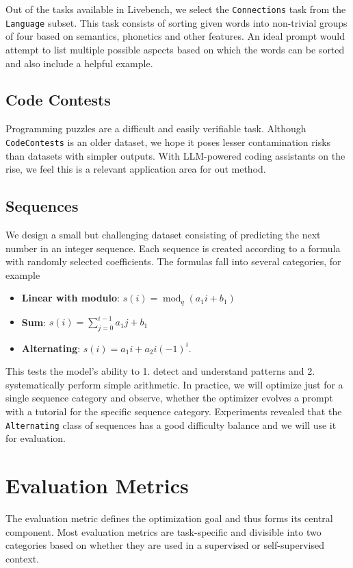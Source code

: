 Out of the tasks available in Livebench, we select the \texttt{Connections} task from the \texttt{Language} subset. 
This task consists of sorting given words into non-trivial groups of four based on semantics, phonetics and other features. 
An ideal prompt would attempt to list multiple possible aspects based on which the words can be sorted and also include a helpful example.

\subsection{Code Contests}
Programming puzzles are a difficult and easily verifiable task. Although \texttt{CodeContests}\cite{li2022competition} is an older dataset, 
we hope it poses lesser contamination risks than datasets with simpler outputs. With LLM-powered coding assistants on the rise, we
feel this is a relevant application area for out method. 

\subsection{Sequences}
We design a small but challenging dataset consisting of predicting the next number in an integer sequence.
Each sequence is created according to a formula with randomly selected coefficients. The formulas fall into several categories, for example
\begin{itemize}
    \item \textbf{Linear with modulo}: $s(i) = \operatorname{mod}_{q}(a_{1} i + b_{1})$
    \item \textbf{Sum}: $s(i) = \sum_{j=0}^{i-1}a_{1} j + b_{1}$
    \item \textbf{Alternating}: $s(i) = a_{1}i + a_{2}i(-1)^{i}$.
\end{itemize}
This tests the model's ability to 1. detect and understand patterns and 2. systematically perform simple arithmetic. 
In practice, we will optimize just for a single sequence category and observe, whether the optimizer evolves a prompt with a tutorial for the specific sequence category.
Experiments revealed that the \texttt{Alternating} class of sequences has a good difficulty balance and we will use it for evaluation.



\section{Evaluation Metrics}
The evaluation metric defines the optimization goal and thus forms its central component. 
Most evaluation metrics are task-specific and divisible into two categories based on whether they are used in a supervised or self-supervised context.
